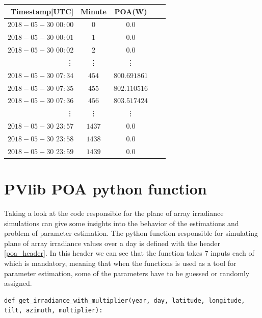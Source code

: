 \begin{table}[h]

\centering

\begin{tabular}{r|cccc} \hline\hline

Timestamp[UTC] & Minute & POA(W) \\ \hline
$2018-05-30$ $00:00$ &  $0$ & $0.0$\\
$2018-05-30$ $00:01$ &  $1$ & $0.0$\\
$2018-05-30$ $00:02$ &  $2$ & $0.0$\\
\vdots & \vdots & \vdots \\
$2018-05-30$ $ 07:34$ & $454$ & $800.691861$\\
$2018-05-30 $ $07:35$ & $455$ & $802.110516$\\
$2018-05-30 $ $07:36$ & $456$ & $803.517424$\\
\vdots & \vdots & \vdots \\
$2018-05-30$ $ 23:57$ & $1437$ & $0.0$\\
$2018-05-30 $ $23:58$ & $1438$ & $0.0$\\
$2018-05-30 $ $23:59$ & $1439$ & $0.0$\\

\hline\hline
\end{tabular}
\label{table_poa_simulated_format}
\end{table}

\section{PVlib POA python function} %
Taking a look at the code responsible for the plane of array irradiance simulations can give some insights into the behavior of the estimations and problem of parameter estimation. The  python function responsible for simulating plane of array irradiance values over a day is defined with the header \ref{poa_header}. In this header we can see that the function takes 7 inputs each of which is mandatory, meaning that when the functions is used as a tool for parameter estimation, some of the parameters have to be guessed or randomly assigned.

\begin{lstlisting}[caption={PVlib POA simulation function header.}, label={poa_header}]
def get_irradiance_with_multiplier(year, day, latitude, longitude, tilt, azimuth, multiplier):
\end{lstlisting}







